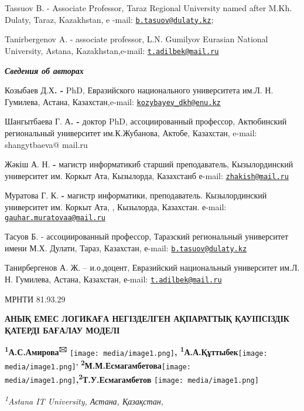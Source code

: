 \documentclass[
]{article}
\begin{document}
Tassuov B. - Associate Professor, Taraz Regional University named after
M.Kh. Dulaty, Taraz, Kazakhstan, e -mail:
\href{mailto:b.tasuov@dulaty.kz}{\nolinkurl{b.tasuov@dulaty.kz}};

Tanirbergenov A. - associate professor, L.N. Gumilyov Eurasian National
University, Astana, Kazakhstan,e-mail:
\href{mailto:t.adilbek@mail.ru}{\nolinkurl{t.adilbek@mail.ru}}

\emph{\textbf{Сведения об авторах}}

Козыбаев Д.Х\textbf{. -} PhD, Евразийского национального университета
им.Л. Н. Гумилева, Астана, Казахстан,e-mail:
\href{mailto:kozybayev_dkh@enu.kz}{\nolinkurl{kozybayev\_dkh@enu.kz}}

Шангытбаева Г. А\textbf{. -} доктор PhD, ассоциированный профессор,
Актюбинский региональный университет им.К.Жубанова, Актобе, Казахстан,
e-mail: shangytbaeva@ mail.ru

Жәкіш А. Н. \textbf{-} магистр информатикиб старший преподаватель,
Кызылординский университет им. Коркыт Ата, Кызылорда, Казахстанб е-mail:
\href{mailto:zhakish@mail.ru}{\nolinkurl{zhakish@mail.ru}}

Муратова Г. К. \textbf{-} магистр информатики, преподаватель.
Кызылординский университет им. Коркыт Ата, , Кызылорда, Казахстан.
е-mail:
\href{mailto:gauhar.muratovaa@mail.ru}{\nolinkurl{gauhar.muratovaa@mail.ru}}

Тасуов Б. - ассоциированный профессор, Таразский региональный
университет имени М.Х. Дулати, Тараз, Казахстан, е-mail:
\href{mailto:b.tasuov@dulaty.kz}{\nolinkurl{b.tasuov@dulaty.kz}}

Танирбергенов А. Ж. -- и.о.доцент, Евразийский национальный университет
им.Л. Н. Гумилева, Астана, Казахстан, е-mail:
\href{mailto:t.adilbek@mail.ru}{\nolinkurl{t.adilbek@mail.ru}}

МРНТИ 81.93.29

\textbf{АНЫҚ ЕМЕС ЛОГИКАҒА НЕГІЗДЕЛГЕН АҚПАРАТТЫҚ ҚАУІПСІЗДІК ҚАТЕРДІ
БАҒАЛАУ МОДЕЛІ}

\textbf{\textsuperscript{1}А.С.Амирова\textsuperscript{🖂}}
\texttt{[image: media/image1.png]}\textbf{,
\textsuperscript{1}А.А.Құттыбек}\texttt{[image: media/image1.png]}\textbf{\textsuperscript{,
2}М.М.Есмагамбетова}\texttt{[image: media/image1.png]}\textbf{,\textsuperscript{2}Т.У.Есмагамбетов}
\texttt{[image: media/image1.png]}

\emph{\textsuperscript{1}Astana IT University, Астана, Қазақстан,}
\end{document}
